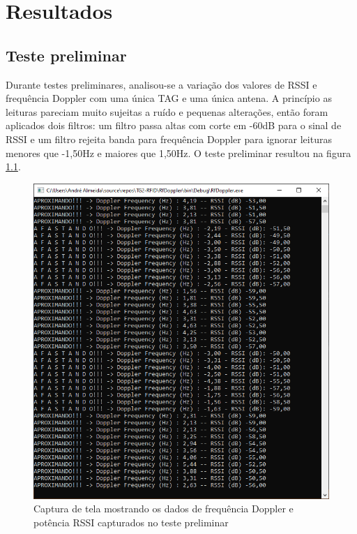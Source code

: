 
\chapter{Resultados\label{chap:Resultados}}



\section{Teste preliminar} \label{sect:testepreliminar}

Durante testes preliminares, analisou-se a variação dos valores de RSSI e frequência Doppler com uma única TAG e uma única antena. A princípio as leituras pareciam muito sujeitas a ruído e pequenas alterações, então foram aplicados dois filtros: um filtro passa altas com corte em -60dB para o sinal de RSSI e um filtro rejeita banda para frequência Doppler para ignorar leituras menores que -1,50Hz e maiores que 1,50Hz. O teste preliminar resultou na figura \ref{fig:teste_preliminar}.
 
 \begin{figure}[ht]
    \centering
    \includegraphics[width=0.7\linewidth]{figs/Metodologia/teste_doppler+RSSI_corte_60db.PNG}
    \caption{Captura de tela mostrando os dados de frequência Doppler e potência RSSI capturados no teste preliminar}
    \label{fig:teste_preliminar}
\end{figure}
 
